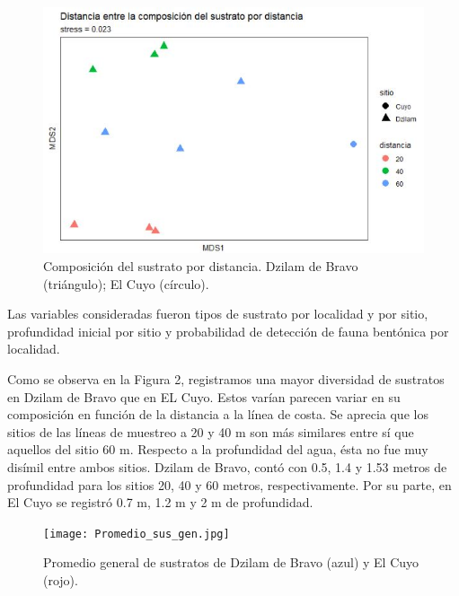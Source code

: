\documentclass[
  authoryear,
  preprint,
  3p,
  twocolumn]{elsarticle}
\begin{document}
\begin{figure}

{\centering \includegraphics{MDS.JPG}

}

\caption{Composición del sustrato por distancia. Dzilam de Bravo
(triángulo); El Cuyo (círculo).}

\end{figure}

Las variables consideradas fueron tipos de sustrato por localidad y por
sitio, profundidad inicial por sitio y probabilidad de detección de
fauna bentónica por localidad.

Como se observa en la Figura 2, registramos una mayor diversidad de
sustratos en Dzilam de Bravo que en EL Cuyo. Estos varían parecen variar
en su composición en función de la distancia a la línea de costa. Se
aprecia que los sitios de las líneas de muestreo a 20 y 40 m son más
similares entre sí que aquellos del sitio 60 m. Respecto a la
profundidad del agua, ésta no fue muy disímil entre ambos sitios. Dzilam
de Bravo, contó con 0.5, 1.4 y 1.53 metros de profundidad para los
sitios 20, 40 y 60 metros, respectivamente. Por su parte, en El Cuyo se
registró 0.7 m, 1.2 m y 2 m de profundidad.

\begin{figure}

{\centering \texttt{[image: Promedio\_sus\_gen.jpg]}

}

\caption{Promedio general de sustratos de Dzilam de Bravo (azul) y El
Cuyo (rojo).}

\end{figure}
\end{document}
